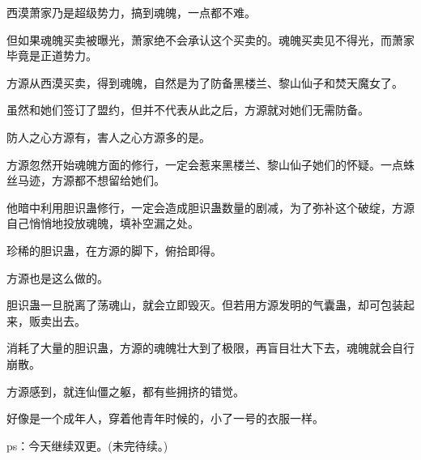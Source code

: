 \begin{this_body}
西漠萧家乃是超级势力，搞到魂魄，一点都不难。

但如果魂魄买卖被曝光，萧家绝不会承认这个买卖的。魂魄买卖见不得光，而萧家毕竟是正道势力。

方源从西漠买卖，得到魂魄，自然是为了防备黑楼兰、黎山仙子和焚天魔女了。

虽然和她们签订了盟约，但并不代表从此之后，方源就对她们无需防备。

防人之心方源有，害人之心方源多的是。

方源忽然开始魂魄方面的修行，一定会惹来黑楼兰、黎山仙子她们的怀疑。一点蛛丝马迹，方源都不想留给她们。

他暗中利用胆识蛊修行，一定会造成胆识蛊数量的剧减，为了弥补这个破绽，方源自己悄悄地投放魂魄，填补空漏之处。

珍稀的胆识蛊，在方源的脚下，俯拾即得。

方源也是这么做的。

胆识蛊一旦脱离了荡魂山，就会立即毁灭。但若用方源发明的气囊蛊，却可包装起来，贩卖出去。

消耗了大量的胆识蛊，方源的魂魄壮大到了极限，再盲目壮大下去，魂魄就会自行崩散。

方源感到，就连仙僵之躯，都有些拥挤的错觉。

好像是一个成年人，穿着他青年时候的，小了一号的衣服一样。

ps：今天继续双更。(未完待续。)

\end{this_body}

